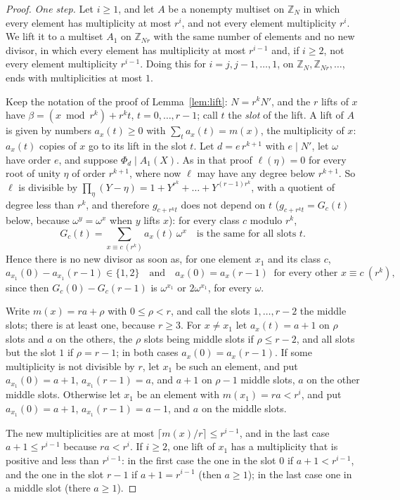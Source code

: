 \documentclass[11pt,a4paper]{amsart}
\theoremstyle{definition}
\theoremstyle{remark}
\newcommand{\Z}{\mathbb{Z}}
\begin{document}
\begin{proof}
\emph{One step.} Let $i\ge1$, and let $A$ be a nonempty multiset on $\Z_N$ in which every element has multiplicity
at most $r^i$, and not every element multiplicity $r^i$. We lift it to a multiset $A_1$ on $\Z_{Nr}$ with the same number of elements and no new
divisor, in which every element has multiplicity at most $r^{i-1}$ and, if $i\ge2$, not every element multiplicity $r^{i-1}$. Doing this for
$i=j,j-1,\dots,1$, on $\Z_N,\Z_{Nr},\dots$, ends with multiplicities at most $1$.

Keep the notation of the proof of Lemma~\ref{lem:lift}: $N=r^kN'$, and the $r$ lifts of $x$ have
$\beta=(x\bmod r^k)+r^kt$, $t=0,\dots,r-1$; call $t$ the \emph{slot} of the lift. A lift of $A$ is given by
numbers $a_x(t)\ge0$ with $\sum_ta_x(t)=m(x)$, the multiplicity of $x$: $a_x(t)$ copies of $x$ go to its lift in
the slot $t$. Let $d=e\,r^{k+1}$ with $e\mid N'$, let $\omega$ have order $e$, and suppose $\Phi_d\mid A_1(X)$.
As in that proof $\ell(\eta)=0$ for every root of unity $\eta$ of order $r^{k+1}$, where now $\ell$ may have any
degree below $r^{k+1}$. So $\ell$ is divisible by $\prod_\eta(Y-\eta)=1+Y^{r^k}+\dots+Y^{(r-1)r^k}$, with a quotient
of degree less than $r^k$, and therefore $g_{c+r^kt}$ does not depend on $t$ ($g_{c+r^kt}=G_c(t)$ below, because
$\omega^y=\omega^x$ when $y$ lifts $x$): for every class $c$ modulo $r^k$,
\[ G_c(t)=\sum_{x\equiv c\ (r^k)}a_x(t)\,\omega^{x}\quad\text{is the same for all slots } t. \]
Hence there is no new divisor as soon as, for one element $x_1$ and its class $c$,
\[ a_{x_1}(0)-a_{x_1}(r-1)\in\{1,2\}\quad\text{and}\quad a_x(0)=a_x(r-1)\ \text{ for every other } x\equiv c\ (r^k), \]
since then $G_c(0)-G_c(r-1)$ is $\omega^{x_1}$ or $2\omega^{x_1}$, for every $\omega$.

Write $m(x)=ra+\rho$ with $0\le\rho<r$, and call the slots $1,\dots,r-2$ the middle slots; there is at least one, because
$r\ge3$. For $x\ne x_1$ let $a_x(t)=a+1$ on $\rho$ slots and $a$ on the others, the $\rho$ slots being middle slots
if $\rho\le r-2$, and all slots but the slot $1$ if $\rho=r-1$; in both cases $a_x(0)=a_x(r-1)$. If some
multiplicity is not divisible by $r$, let $x_1$ be such an element, and put $a_{x_1}(0)=a+1$, $a_{x_1}(r-1)=a$,
and $a+1$ on $\rho-1$ middle slots, $a$ on the other middle slots. Otherwise let $x_1$ be an element with
$m(x_1)=ra<r^i$, and put $a_{x_1}(0)=a+1$, $a_{x_1}(r-1)=a-1$, and $a$ on the middle slots.

The new multiplicities are at most $\lceil m(x)/r\rceil\le r^{i-1}$, and in the last case $a+1\le r^{i-1}$ because
$ra<r^i$. If $i\ge2$, one lift of $x_1$ has a multiplicity that is positive and less than $r^{i-1}$: in the first
case the one in the slot $0$ if $a+1<r^{i-1}$, and the one in the slot $r-1$ if $a+1=r^{i-1}$ (then $a\ge1$); in
the last case one in a middle slot (there $a\ge1$).
\end{proof}
\end{document}
